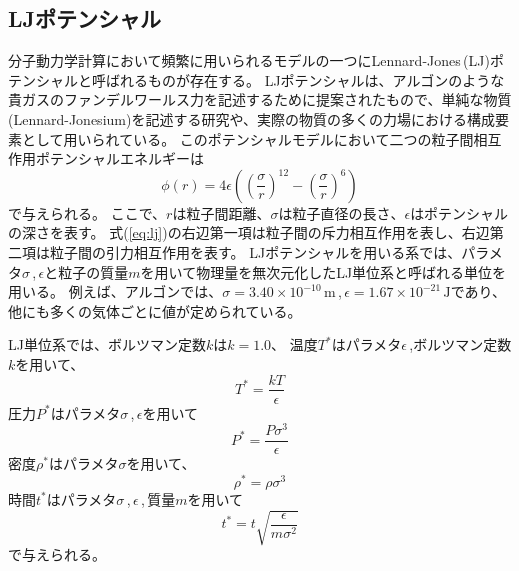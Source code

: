 \documentclass[titlepage]{jsreport}
\begin{document}
\subsection{LJポテンシャル}\label{principle-subsec:LJ}
分子動力学計算において頻繁に用いられるモデルの一つにLennard-Jones\,(LJ)ポテンシャルと呼ばれるものが存在する。
LJポテンシャルは、アルゴンのような貴ガスのファンデルワールス力を記述するために提案された\cite{lennard-jones}もので、単純な物質(Lennard-Jonesium)を記述する研究\cite{lennard-jonesium-1,lennard-jonesium-2}や、実際の物質の多くの力場における構成要素\cite{lennard-jones-force-field-1,lennard-jones-force-field-2, lennard-jones-force-field-3}として用いられている。
このポテンシャルモデルにおいて二つの粒子間相互作用ポテンシャルエネルギーは
\large
\begin{equation}
\phi(r)=4{\epsilon}\left(\left(\frac{\sigma}{r}\right)^{12}-\left(\frac{\sigma}{r}\right)^6\right)\label{eq:lj}
\end{equation}
\normalsize
で与えられる。
ここで、$r$は粒子間距離、${\sigma}$は粒子直径の長さ、${\epsilon}$はポテンシャルの深さを表す。
式(\ref{eq:lj})の右辺第一項は粒子間の斥力相互作用を表し、右辺第二項は粒子間の引力相互作用を表す。
LJポテンシャルを用いる系では、パラメタ$\sigma$\,,\,$\epsilon$と粒子の質量$m$を用いて物理量を無次元化したLJ単位系\cite{lennard-jones-system-of-units}と呼ばれる単位を用いる。
例えば、アルゴンでは、${\sigma}=3.40×10^{-10}\,\mathrm{m}$\,,\,${\epsilon}=1.67×10^{-21}\,\mathrm{J}$であり\cite{lennard-jones-argon-parameters}、
他にも多くの気体ごとに値が定められている\cite{lennard-jones-many-parameters}。

LJ単位系では、ボルツマン定数$k$は$k=1.0$、
温度$T^*$はパラメタ$\epsilon$\,,ボルツマン定数$k$を用いて、
\large
\begin{equation}
T^*=\frac{kT}{\epsilon}\label{eq:T}
\end{equation}
\normalsize
圧力$P^*$はパラメタ${\sigma}$\,,\,${\epsilon}$を用いて
\large
\begin{equation}
P^*=\frac{P\sigma^3}{\epsilon}\label{eq:P}
\end{equation}
\normalsize
密度$\rho^*$はパラメタ$\sigma$を用いて、
\large
\begin{equation}
\rho^*=\rho{\sigma}^3\label{eq:rho}
\end{equation}
\normalsize
時間$t^*$はパラメタ${\sigma}$\,,\,${\epsilon}$\,,\,質量$m$を用いて
\large
\begin{equation}
t^*=t\sqrt{\frac{\epsilon}{m{\sigma}^2}}\label{eq:time}
\end{equation}
\normalsize
で与えられる。
\end{document}
